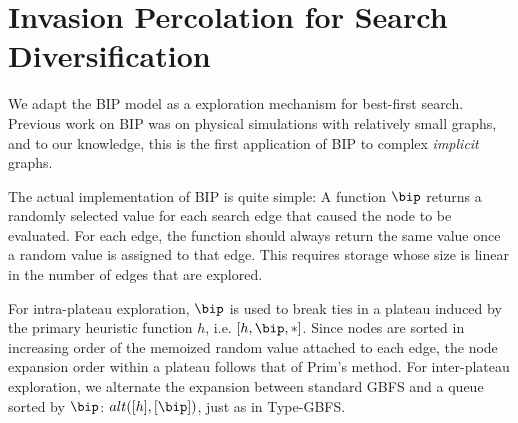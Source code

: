 \section{Invasion Percolation for Search Diversification}
We adapt the BIP model as a exploration mechanism for best-first search.
Previous work on BIP was on physical simulations with relatively small graphs, 
and to our knowledge, this is the first application of BIP  to complex \emph{implicit} graphs.


The actual implementation of BIP is quite simple:
A %
function $\bip$ returns a randomly selected value 
for each search edge that caused the node to be evaluated.
For each edge, the function should always return the same value  once a random value is assigned to that edge. This requires storage whose size is linear in the number of edges that are explored.


For intra-plateau exploration, $\bip$ is used to break ties in a plateau induced by the primary heuristic function $h$, i.e. $[h,\bip,*]$.
Since nodes are sorted in increasing order of the memoized random value attached to each edge, the node expansion order within a plateau follows that of Prim's method.
For inter-plateau exploration, we alternate the expansion between standard GBFS and a queue sorted by $\bip$: $\mit{alt}([h],[\bip])$, just as in Type-GBFS.


